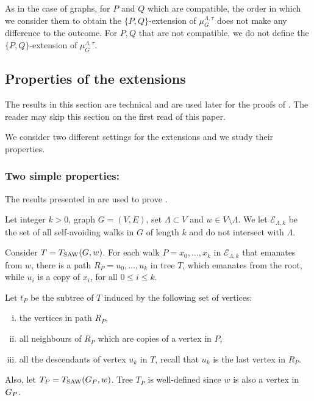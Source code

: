 \documentclass[11pt,reqno]{amsart}
\numberwithin{equation}{section}
\newcommand{\cE}{{\mathcal{E}}}
\newcommand{\amethyst}[1]{{\color{amethyst}#1} }
\newcommand{\blue}[1]{{\color{blue}#1}}
\newcommand{\bluepigment}[1]{{\color{blue(pigment)}#1}}
\newcommand{\capri}[1]{{\color{capri}#1}}
\newcommand{\goldenbrown}[1]{{\color{goldenbrown}#1}}
\newcommand{\heliotrope}[1]{{\color{heliotrope}#1}}
\newcommand{\magenta}[1]{{\color{magenta}#1}}
\newcommand{\iris}[1]{{\color{iris}#1}}
\newcommand{\red}[1]{{\color{red}#1}}
\newcommand{\ExtV}{\iris{\cE}}
\newcommand{\Tsaw}{T_{\rm SAW}}
\renewcommand{\amethyst}[1]{#1}
\renewcommand{\blue}[1]{#1}
\renewcommand{\bluepigment}[1]{#1}
\renewcommand{\capri}[1]{#1}
\renewcommand{\goldenbrown}[1]{#1}
\renewcommand{\heliotrope}[1]{#1}
\renewcommand{\magenta}[1]{#1}
\renewcommand{\iris}[1]{#1}
\renewcommand{\red}[1]{#1}
\newcommand{\ki}{\capri{i}}
\newcommand{\kk}{\bluepigment{k}}
\newcommand{\kP}{\goldenbrown{P}}
\newcommand{\kQ}{\amethyst{Q}}
\newcommand{\ku}{\red{u}}
\newcommand{\kw}{\blue{w}}
\newcommand{\kx}{\heliotrope{x}}
\renewcommand{\ki}{i}
\renewcommand{\kk}{k}
\renewcommand{\kP}{P}
\renewcommand{\kQ}{Q}
\renewcommand{\ku}{u}
\renewcommand{\kw}{w}
\renewcommand{\kx}{x}
\begin{document}
As in the case of graphs, for $\kP$ and $\kQ$ which are compatible, the order in which we consider them to obtain the 
$\{\kP,\kQ\}$-extension of $\mu^{\Lambda,\tau}_G$ does not make any difference to the outcome. 
For $\kP,\kQ$ that are not compatible, we do not define the $\{\kP,\kQ\}$-extension of $\mu^{\Lambda,\tau}_G$.










\newcommand{\Tw}{\magenta{T}}
\newcommand{\STw}{\capri{t}}
\newcommand{\XTPw}{\blue{T_{\kP}}}


%

\subsection{Properties of the extensions}\label{sec:PropPextG}\label{sec:PropPextMu}
\label{sec:PropsOfExtensions}

The results in this section are technical and are used later for  the proofs of 
.
The reader may skip this section on the first read of this paper. 



We consider two different settings for the extensions and we study their properties. 



\subsubsection{Two simple properties:}\label{sec:BasicPropExt}
The results presented  in  are used to prove . 

Let integer $\kk>0$, graph $G=(V,E)$, set $\Lambda\subset V$ and $\kw\in V\setminus \Lambda$. 
We let $\ExtV_{\Lambda, \kk}$ be the set of all self-avoiding walks in $G$ of length $\kk$ and do not intersect 
with $\Lambda$.



Consider $\Tw=\Tsaw(G,\kw)$. For each walk $\kP=\kx_0,\ldots,\kx_k$ in $\ExtV_{\Lambda,\kk}$ that
emanates from $\kw$,   there is a path $R_{\kP}=\ku_0,\ldots, \ku_{\kk}$ in tree $\Tw$, which emanates from the root, 
while $\ku_{\ki}$ is a copy of $\kx_{\ki}$, for all $0\leq \ki \leq \kk $. 

Let $\STw_{\kP}$ be the subtree of $\Tw$ induced by the following set of vertices:
\begin{enumerate}[(i)]
\item the vertices in path $R_{\kP}$,
\item all neighbours of $R_{\kP}$ which are copies of a vertex in $\kP$,
\item  all the descendants of vertex $\ku_{\kk}$ in $\Tw$, recall that $\ku_{\kk}$ is the last vertex in $R_{\kP}$.
\end{enumerate}
Also, let $\XTPw=\Tsaw(\gext{G}{\kP},\kw)$. Tree $\XTPw$ is well-defined since $\kw$ is also a vertex in $\gext{G}{\kP}$. 
\end{document}

